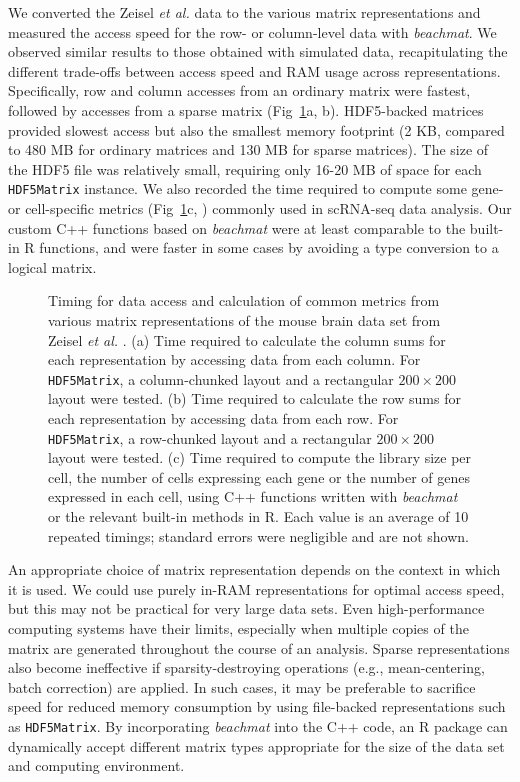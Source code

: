 \documentclass[10pt,letterpaper]{article}
\newcommand{\beachmat}{\textit{beachmat}}
\newcommand{\code}[1]{\texttt{#1}}
\begin{document}
We converted the Zeisel \textit{et al.} data to the various matrix representations and measured the access speed for the row- or column-level data with \beachmat{}.
We observed similar results to those obtained with simulated data, recapitulating the different trade-offs between access speed and RAM usage across representations.
Specifically, row and column accesses from an ordinary matrix were fastest, followed by accesses from a sparse matrix (Fig~\ref{fig:zeisel}a, b).
HDF5-backed matrices provided slowest access but also the smallest memory footprint (2 KB, compared to 480 MB for ordinary matrices and 130 MB for sparse matrices).
The size of the HDF5 file was relatively small, requiring only 16-20 MB of space for each \code{HDF5Matrix} instance.
We also recorded the time required to compute some gene- or cell-specific metrics (Fig~\ref{fig:zeisel}c, \suppsecrealzeisel{}) commonly used in scRNA-seq data analysis.
Our custom C++ functions based on \beachmat{} were at least comparable to the built-in R functions, and were faster in some cases by avoiding a type conversion to a logical matrix.

\begin{figure}[b]
    \caption{Timing for data access and calculation of common metrics from various matrix representations of the mouse brain data set from Zeisel \textit{et al.} \cite{zeisel2015brain}.
(a) Time required to calculate the column sums for each representation by accessing data from each column.
For \code{HDF5Matrix}, a column-chunked layout and a rectangular $200 \times 200$ layout were tested.
(b) Time required to calculate the row sums for each representation by accessing data from each row.
For \code{HDF5Matrix}, a row-chunked layout and a rectangular $200 \times 200$ layout were tested.
(c) Time required to compute the library size per cell, the number of cells expressing each gene or the number of genes expressed in each cell, using C++ functions written with \beachmat{} or the relevant built-in methods in R.
Each value is an average of 10 repeated timings; standard errors were negligible and are not shown.}
    \label{fig:zeisel}
\end{figure}

An appropriate choice of matrix representation depends on the context in which it is used.
We could use purely in-RAM representations for optimal access speed, but this may not be practical for very large data sets.
Even high-performance computing systems have their limits, especially when multiple copies of the matrix are generated throughout the course of an analysis.
Sparse representations also become ineffective if sparsity-destroying operations (e.g., mean-centering, batch correction) are applied.
In such cases, it may be preferable to sacrifice speed for reduced memory consumption by using file-backed representations such as \code{HDF5Matrix}.
By incorporating \beachmat{} into the C++ code, an R package can dynamically accept different matrix types appropriate for the size of the data set and computing environment.
\end{document}
